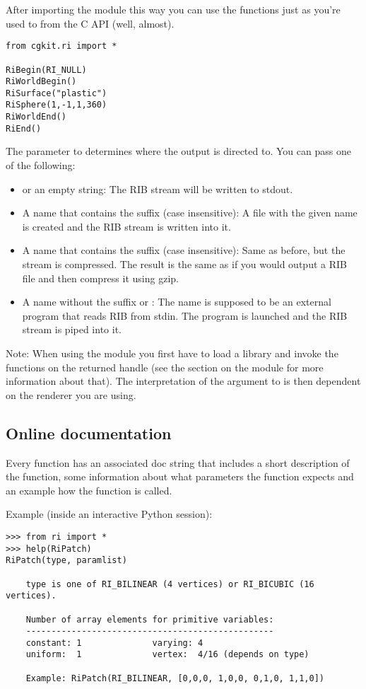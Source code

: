 After importing the module this way you can use the functions just as
you're used to from the C API (well, almost).

\begin{verbatim}
from cgkit.ri import *

RiBegin(RI_NULL)
RiWorldBegin()
RiSurface("plastic")
RiSphere(1,-1,1,360)
RiWorldEnd()
RiEnd()
\end{verbatim}

The parameter to  determines where the output is
directed to. You can pass one of the following:

\begin{itemize}
\item {} or an empty string: The RIB stream will be written to 
stdout. 
\item A name that contains the suffix  (case insensitive): 
A file with the given name is created and the RIB stream is written into it. 
\item A name that contains the suffix  (case insensitive):
Same as before, but the stream is compressed. The result is the same as if you
would output a RIB file and then compress it using gzip.  
\item A name without the suffix  or : The name
is supposed to be an external program that reads RIB from stdin. 
The program is launched and the RIB stream is piped into it.
\end{itemize}

Note: When using the  module you first have to load a library
and invoke the functions on the returned handle (see the section on the
 module for more information about that). The
interpretation of the argument to  is then dependent on the
renderer you are using.
\subsection{Online documentation}

Every function has an associated doc string that includes a short
description of the function, some information about what parameters
the function expects and an example how the function is called.

Example (inside an interactive Python session):

\begin{verbatim}
>>> from ri import *
>>> help(RiPatch)
RiPatch(type, paramlist)

    type is one of RI_BILINEAR (4 vertices) or RI_BICUBIC (16 vertices).

    Number of array elements for primitive variables:
    -------------------------------------------------
    constant: 1              varying: 4
    uniform:  1              vertex:  4/16 (depends on type)

    Example: RiPatch(RI_BILINEAR, [0,0,0, 1,0,0, 0,1,0, 1,1,0])
\end{verbatim}

